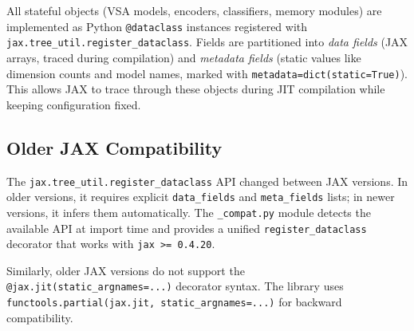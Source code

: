 \documentclass[twoside,11pt]{article}
\begin{document}
All stateful objects (VSA models, encoders, classifiers, memory modules) are implemented as Python \texttt{@dataclass} instances registered with \texttt{jax.tree\_util.register\_dataclass}. Fields are partitioned into \emph{data fields} (JAX arrays, traced during compilation) and \emph{metadata fields} (static values like dimension counts and model names, marked with \texttt{metadata=dict(static=True)}). This allows JAX to trace through these objects during JIT compilation while keeping configuration fixed.

\subsection{Older JAX Compatibility}

The \texttt{jax.tree\_util.register\_dataclass} API changed between JAX versions. In older versions, it requires explicit \texttt{data\_fields} and \texttt{meta\_fields} lists; in newer versions, it infers them automatically. The \texttt{\_compat.py} module detects the available API at import time and provides a unified \texttt{register\_dataclass} decorator that works with \texttt{jax >= 0.4.20}.

Similarly, older JAX versions do not support the \texttt{@jax.jit(static\_argnames=...)} decorator syntax. The library uses \texttt{functools.partial(jax.jit, static\_argnames=...)} for backward compatibility.
\end{document}
